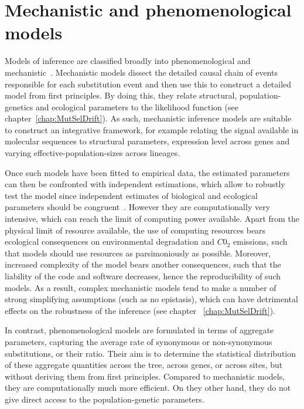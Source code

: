 \section{Mechanistic and phenomenological models}
\label{sec:mechanistic-and-phenomenological-models}

Models of inference are classified broadly into phenomenological and mechanistic~\citep{Rodrigue2010a}.
Mechanistic models dissect the detailed causal chain of events responsible for each substitution event and then use this to construct a detailed model from first principles.
By doing this, they relate structural, population-genetics and ecological parameters to the \gls{likelihood} function (see chapter~\ref{chap:MutSelDrift}).
As such, mechanistic inference models are suitable to construct an integrative framework, for example relating the signal available in molecular sequences to structural parameters, expression level across genes and varying \glspl{effective-population-size} across lineages.

Once such models have been fitted to empirical data, the estimated parameters can then be confronted with independent estimations, which allow to robustly test the model since independent estimates of biological and ecological parameters should be congruent~\citep{Dasmeh2014}.
However they are computationally very intensive, which can reach the limit of computing power available.
Apart from the physical limit of resource available, the use of computing resources bears ecological consequences on environmental degradation and $C0_2$ emissions, such that models should use resources as parsimoniously as possible.
Moreover, increased complexity of the model bears another consequences, such that the liability of the code and software decreases, hence the reproducibility of such models.
As a result, complex mechanistic models tend to make a number of strong simplifying assumptions (such as no epistasis), which can have detrimental effects on the robustness of the inference (see chapter ~\ref{chap:MutSelDrift}).

In contrast, phenomenological models are formulated in terms of aggregate parameters, capturing the average rate of synonymous or non-synonymous substitutions, or their ratio.
Their aim is to determine the statistical distribution of these aggregate quantities across the tree, across genes, or across sites, but without deriving them from first principles.
Compared to mechanistic models, they are computationally much more efficient.
On they other hand, they do not give direct access to the population-genetic parameters.

